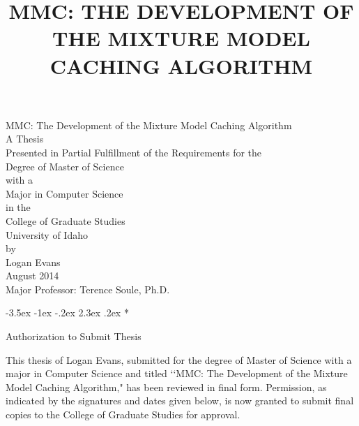 \documentclass[12pt,letterpaper]{report}
\title{\textbf{MMC: THE DEVELOPMENT OF THE MIXTURE MODEL CACHING ALGORITHM}}
\makeatletter
\renewcommand\section{\@startsection{section}{1}{\z@}%
                                  {-3.5ex \@plus -1ex \@minus -.2ex}%
                                  {2.3ex \@plus.2ex}%
                                  {\normalfont\large\bfseries}}
\makeatother
\begin{document}
 
\pagestyle{myheadings}

\thispagestyle{empty}

\begin{center}
MMC: The Development of the Mixture Model Caching Algorithm\\
\vspace{73pt}
A Thesis\\
Presented in Partial Fulfillment of the Requirements for the\\
Degree of Master of Science\\
with a\\
Major in Computer Science\\
in the\\
College of Graduate Studies\\
University of Idaho\\
\vspace{84pt}
by\\
Logan Evans\\
\vspace{48pt}
August 2014\\
\vspace{60pt}
Major Professor: Terence Soule, Ph.D.\\
\end{center}
\pagebreak

\section*{\vspace*{-35pt}\large{
  \begin{center}
  Authorization to Submit Thesis
  \end{center}}\vspace*{-10pt}}

  \begin{flushleft}
  This thesis of Logan Evans, submitted for the degree of Master of Science with
  a major in Computer Science and titled \lq\lq MMC: The Development of the
  Mixture Model Caching Algorithm," has been reviewed in final form. Permission,
  as indicated by the signatures and dates given below, is now granted to submit
  final copies to the College of Graduate Studies for approval.
  \end{flushleft}
\end{document}
